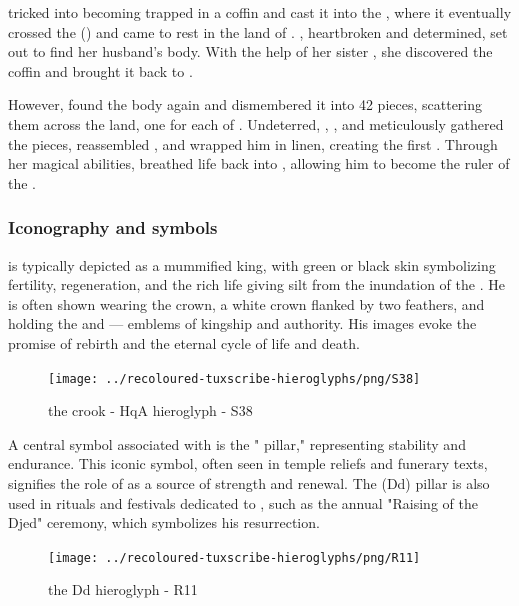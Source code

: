  tricked  into becoming trapped in a coffin and cast it into the , where it eventually crossed the  () and came to rest in the land of . , heartbroken and determined, set out to find her husband's body. With the help of her sister , she discovered the coffin and brought it back to .

However,  found the body again and dismembered it into 42 pieces, scattering them across the land, one for each  of . Undeterred, , , and  meticulously gathered the pieces, reassembled , and wrapped him in linen, creating the first . Through her magical abilities,  breathed life back into , allowing him to become the ruler of the .

\subsubsection*{Iconography and symbols}

 is typically depicted as a mummified king, with green or black skin symbolizing fertility, regeneration, and the rich life giving silt from the inundation of the . He is often shown wearing the  crown, a white crown flanked by two  feathers, and holding the  and  — emblems of kingship and authority. His images evoke the promise of rebirth and the eternal cycle of life and death.

\begin{figure} [H]
	\centering
	\texttt{[image: ../recoloured-tuxscribe-hieroglyphs/png/S38]}
	\caption{the crook - HqA hieroglyph - S38}
\end{figure}

A central symbol associated with  is the " pillar," representing stability and endurance. This iconic symbol, often seen in temple reliefs and funerary texts, signifies the role of  as a source of strength and renewal. The  (Dd) pillar is also used in rituals and festivals dedicated to , such as the annual "Raising of the Djed" ceremony, which symbolizes his resurrection.

\begin{figure} [H]
	\centering
	\texttt{[image: ../recoloured-tuxscribe-hieroglyphs/png/R11]}
	\caption{the Dd hieroglyph - R11}
\end{figure}


